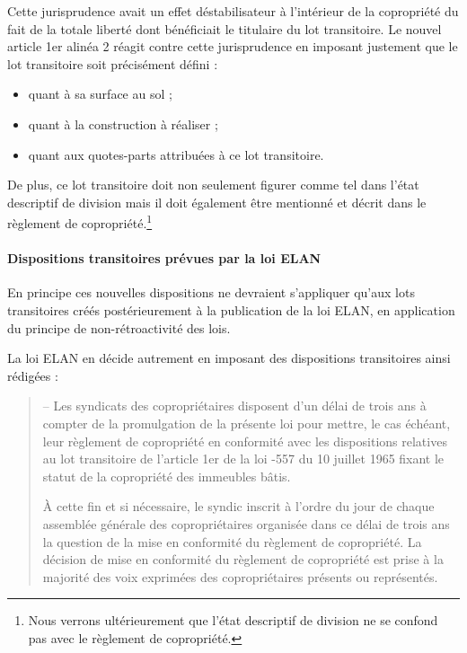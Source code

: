 				Cette jurisprudence avait un effet déstabilisateur à l’intérieur de la copropriété du fait de la totale liberté dont bénéficiait le titulaire du lot transitoire.
				Le nouvel article 1er alinéa 2 réagit contre cette jurisprudence en imposant justement que le lot transitoire soit précisément défini :
				\begin{itemize}
					\item quant à sa surface au sol ;
					\item quant à la construction à réaliser ;
					\item quant aux quotes-parts attribuées à ce lot transitoire.
				\end{itemize}
				
				De plus, ce lot transitoire doit non seulement figurer comme tel dans l’état descriptif de division mais il doit également être mentionné et décrit dans le règlement de copropriété.\footnote{Nous verrons ultérieurement que l’état descriptif de division ne se confond pas avec le règlement de copropriété.}
			
			\paragraph{Dispositions transitoires prévues par la loi ELAN}
	
				En principe ces nouvelles dispositions ne devraient s’appliquer qu’aux lots transitoires créés postérieurement à la publication de la loi ELAN, en application du principe de non-rétroactivité des lois.
				
				La loi ELAN en décide autrement en imposant des dispositions transitoires ainsi rédigées :
				\begin{quote}
					– Les syndicats des copropriétaires disposent d’un délai de trois ans à compter de la promulgation de la présente loi pour mettre, le cas échéant, leur règlement de copropriété en conformité avec les dispositions relatives au lot transitoire de l’article 1er de la loi -557 du 10 juillet 1965 fixant le statut de la copropriété des immeubles bâtis.
					
					À cette fin et si nécessaire, le syndic inscrit à l’ordre du jour de chaque assemblée générale des copropriétaires organisée dans ce délai de trois ans la question de la mise en conformité du règlement de copropriété. La décision de mise en conformité du règlement de copropriété est prise à la majorité des voix exprimées des copropriétaires présents ou représentés.
				\end{quote}
				
